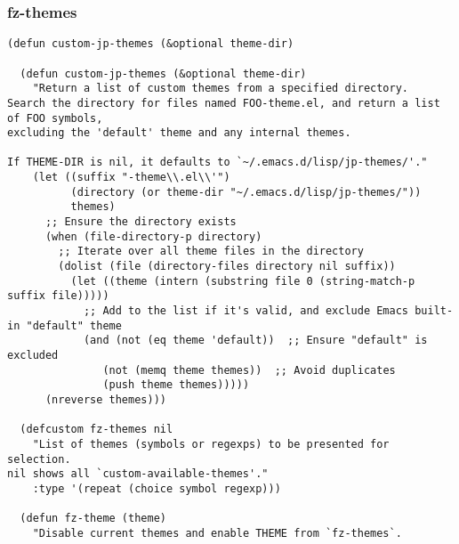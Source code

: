 \documentclass[11pt]{article}
\begin{document}
\subsubsection{fz-themes}
\label{sec:orgb5ad0fd}
\begin{verbatim}
(defun custom-jp-themes (&optional theme-dir)

  (defun custom-jp-themes (&optional theme-dir)
    "Return a list of custom themes from a specified directory.
Search the directory for files named FOO-theme.el, and return a list of FOO symbols,
excluding the 'default' theme and any internal themes.

If THEME-DIR is nil, it defaults to `~/.emacs.d/lisp/jp-themes/'."
    (let ((suffix "-theme\\.el\\'")
          (directory (or theme-dir "~/.emacs.d/lisp/jp-themes/"))
          themes)
      ;; Ensure the directory exists
      (when (file-directory-p directory)
        ;; Iterate over all theme files in the directory
        (dolist (file (directory-files directory nil suffix))
          (let ((theme (intern (substring file 0 (string-match-p suffix file)))))
            ;; Add to the list if it's valid, and exclude Emacs built-in "default" theme
            (and (not (eq theme 'default))  ;; Ensure "default" is excluded
               (not (memq theme themes))  ;; Avoid duplicates
               (push theme themes)))))
      (nreverse themes)))

  (defcustom fz-themes nil
    "List of themes (symbols or regexps) to be presented for selection.
nil shows all `custom-available-themes'."
    :type '(repeat (choice symbol regexp)))

  (defun fz-theme (theme)
    "Disable current themes and enable THEME from `fz-themes`.


\end{verbatim}
\end{document}
